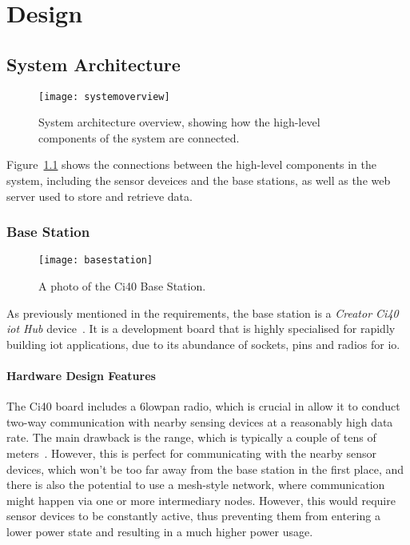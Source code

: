 \chapter{Design}

\section{System Architecture}

\begin{figure}[h]
  \label{overviewfigure}
  \centering
  \texttt{[image: systemoverview]}
  \caption{System architecture overview, showing how the high-level components of the system are connected.}
\end{figure}

Figure~\ref{overviewfigure} shows the connections between the high-level
components in the system, including the sensor deveices and the base
stations, as well as the web server used to store and retrieve data.

\subsection{Base Station}
\begin{figure}
  \label{fig:basestation}
  \centering
  \texttt{[image: basestation]}
  \caption{A photo of the Ci40 Base Station.}
\end{figure}
As previously mentioned in the requirements, the base station is a
\textit{Creator Ci40 \acrshort{iot} Hub} device~\cite{creatorci40}. It is a
development board that is highly specialised for rapidly building
\acrlong{iot} applications, due to its abundance of sockets, pins and radios
for \acrshort{io}.

\subsubsection{Hardware Design Features}

The Ci40 board includes a \gls{6lowpan} radio, which is crucial in allow it
to conduct two-way communication with nearby sensing devices at a reasonably
high data rate. The main drawback is the range, which is typically a couple
of tens of meters~\cite{culler20096lowpan}. However, this is perfect for
communicating with the nearby sensor devices, which won't be too far away
from the base station in the first place, and there is also the potential to
use a mesh-style network, where communication might happen via one or more
intermediary nodes. However, this would require sensor devices to be
constantly active, thus preventing them from entering a lower power state and
resulting in a much higher power usage.

